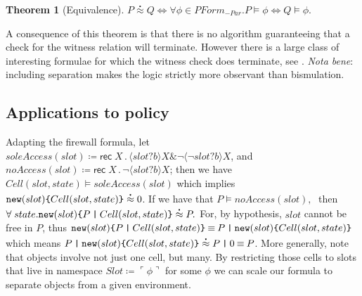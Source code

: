 \documentclass[submission,copyright,creativecommons]{eptcs}
\newcommand{\lpquote}{\ulcorner}
\newcommand{\rpquote}{\urcorner}
\newcommand{\id}[1]{\texttt{#1}}
\newcommand{\juxtap}{\mathbin{\id{|}}}
\newcommand{\scong}{\mathbin{\equiv}}
\newcommand{\binpar}[2]{#1 \juxtap #2}
\newcommand{\defneqls}{\coloneqq}
\newcommand{\wbbisim}{\stackrel{\centerdot}{\approx}} %
\newcommand{\pquotep}[1]{\lpquote #1 \rpquote}
\newcommand{\pprefix}[3]{\langle #1 ? #2 \rangle #3}
\newcommand{\pgfp}[2]{\textsf{rec} \; #1 \mathbin{.} #2}
\newcommand{\riff}{\Leftrightarrow}
\newcommand{\PFormula}{\mathbin{PForm}}
\newtheorem{thm}{Theorem}[subsection]
\numberwithin{equation}{subsection}
\begin{document}
\begin{thm}[Equivalence]\label{sec:equivalence_theorem}
	$P \wbbisim Q \riff \forall \phi \in \PFormula_{-Par} . P \models \phi \riff Q \models \phi .$
\end{thm}

A consequence of this theorem is that there is no algorithm
guaranteeing that a check for the witness relation will
terminate. However there is a large class of interesting formulae for
which the witness check does terminate, see
\cite{DBLP:conf/fossacs/Caires04}. {\em Nota bene}: including
separation makes the logic strictly more observant than bismulation.

\subsection{Applications to policy}

Adapting the firewall formula, let $soleAccess( slot ) \defneqls
\pgfp{X}{\pprefix{slot}{b}{X} \& \neg \pprefix{\neg slot}{b}{X}}$, and
$noAccess( slot ) \defneqls \pgfp{X}{\neg \pprefix{slot}{b}{X}}$; then
we have $Cell (slot, state) \models soleAccess( slot )$ which implies
${\mbox{\tt new}(slot)\mbox{\tt \{} Cell(slot, state) \mbox{\tt \}}}
\wbbisim 0$.  If we have that $P \models noAccess( slot ), \;$ then
$\forall \; state . \mbox{\tt new}(slot)\mbox{\tt \{}
\binpar{P}{Cell(slot, state)} \mbox{\tt \}}\wbbisim P.$ For, by
hypothesis, $slot$ cannot be free in $P$, thus $\mbox{\tt
  new}(slot)\mbox{\tt \{} \binpar{P}{Cell(slot, state)} \mbox{\tt \}}
\scong \binpar{P}{\mbox{\tt new}(slot)\mbox{\tt \{} Cell(slot, state)
  \mbox{\tt \}}}$ which means $\binpar{P}{\mbox{\tt
    new}(slot)\mbox{\tt \{} Cell(slot, state) \mbox{\tt \}}} \wbbisim
\binpar{P}{0} \scong P$.  More generally, note that objects involve
not just one cell, but many. By restricting those cells to slots that
live in namespace $Slot \defneqls \pquotep{\phi}$ for some $\phi$ we
can scale our formula to separate objects from a given environment.
\end{document}
